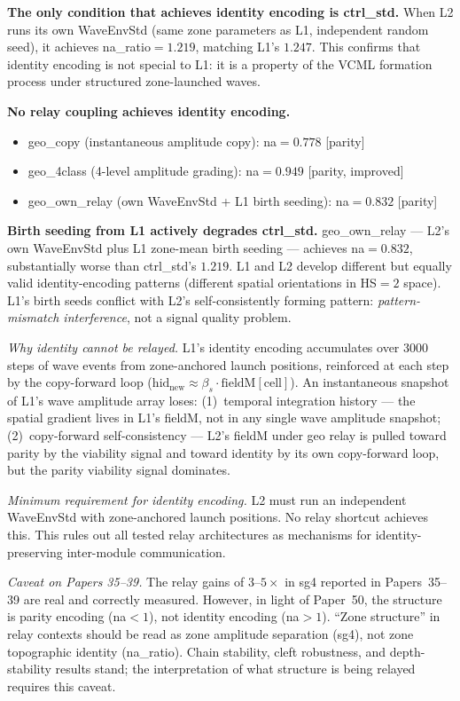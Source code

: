 \documentclass[11pt]{article}
\begin{document}
\textbf{The only condition that achieves identity encoding is ctrl\_std.}
When L2 runs its own WaveEnvStd (same zone parameters as L1, independent
random seed), it achieves na\_ratio$=1.219$, matching L1's $1.247$.
This confirms that identity encoding is not special to L1: it is a
property of the VCML formation process under structured zone-launched waves.

\textbf{No relay coupling achieves identity encoding.}
\begin{itemize}
  \item geo\_copy (instantaneous amplitude copy): na$=0.778$ [parity]
  \item geo\_4class (4-level amplitude grading): na$=0.949$ [parity, improved]
  \item geo\_own\_relay (own WaveEnvStd + L1 birth seeding): na$=0.832$ [parity]
\end{itemize}

\textbf{Birth seeding from L1 actively degrades ctrl\_std.}
geo\_own\_relay --- L2's own WaveEnvStd plus L1 zone-mean birth seeding ---
achieves na$=0.832$, substantially worse than ctrl\_std's $1.219$.
L1 and L2 develop different but equally valid identity-encoding patterns
(different spatial orientations in HS$=2$ space).
L1's birth seeds conflict with L2's self-consistently forming pattern:
\emph{pattern-mismatch interference}, not a signal quality problem.

\textit{Why identity cannot be relayed.}
L1's identity encoding accumulates over 3000 steps of wave events from
zone-anchored launch positions, reinforced at each step by the copy-forward
loop ($\mathrm{hid}_\mathrm{new} \approx \beta_s \cdot \mathrm{fieldM}[\mathrm{cell}]$).
An instantaneous snapshot of L1's wave amplitude array loses:
(1)~temporal integration history --- the spatial gradient lives in L1's fieldM,
not in any single wave amplitude snapshot;
(2)~copy-forward self-consistency --- L2's fieldM under geo relay is pulled toward
parity by the viability signal and toward identity by its own copy-forward loop,
but the parity viability signal dominates.

\textit{Minimum requirement for identity encoding.}
L2 must run an independent WaveEnvStd with zone-anchored launch positions.
No relay shortcut achieves this.
This rules out all tested relay architectures as mechanisms for identity-preserving
inter-module communication.

\textit{Caveat on Papers 35--39.}
The relay gains of $3$--$5\times$ in sg4 reported in Papers~35--39 are real and
correctly measured.
However, in light of Paper~50, the structure is parity encoding (na$<1$),
not identity encoding (na$>1$).
``Zone structure'' in relay contexts should be read as zone amplitude separation
(sg4), not zone topographic identity (na\_ratio).
Chain stability, cleft robustness, and depth-stability results stand;
the interpretation of what structure is being relayed requires this caveat.
\end{document}
